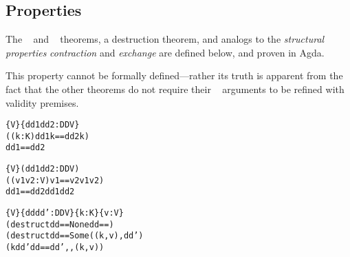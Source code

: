 \subsection{Properties}
\label{sec:DD:props}

The \SemInj~ and \EqDec~ theorems, a destruction theorem, and analogs to the \emph{structural properties} \emph{contraction} and \emph{exchange} are defined below, and proven in Agda.


\begin{remark}[\SemTot]
%
\textnormal{This property cannot be formally defined---rather its truth is apparent from the fact that the other theorems do not require their \dd~ arguments to be refined with validity premises.}
%
\end{remark}

\begin{theorem}[\SemInj]
\label{thm:SemInj}
\justIndent
\begin{alltt}
\altFAll\{V\} \{dd1 dd2 : DD V\} \altRArr
  ((k : K) \altRArr dd1 \altLAng k \altRAng == dd2 \altLAng k \altRAng) \altRArr
  dd1 == dd2
\end{alltt}
\end{theorem}

\begin{theorem}[\EqDec]
\label{thm:EqDec}
\justIndent
\begin{alltt}
\altFAll\{V\} (dd1 dd2 : DD V) \altRArr
  ((v1 v2 : V) \altRArr v1 == v2 \altOr v1 \altNE v2) \altRArr
  dd1 == dd2 \altOr dd1 \altNE dd2
\end{alltt}
\end{theorem}

\begin{theorem}
\label{thm:EzDstr}
\justIndent
\begin{alltt}
\altFAll\{V\} \{dd dd' : DD V\} \{k : K\} \{v : V\} \altRArr
  (destruct dd == None \altRArr dd == \altEmpty)
    \altAnd
  (destruct dd == Some ((k , v) , dd') \altRArr
    (k \altNIn dd' \altAnd dd == dd' ,, (k , v))
\end{alltt}
\end{theorem}

